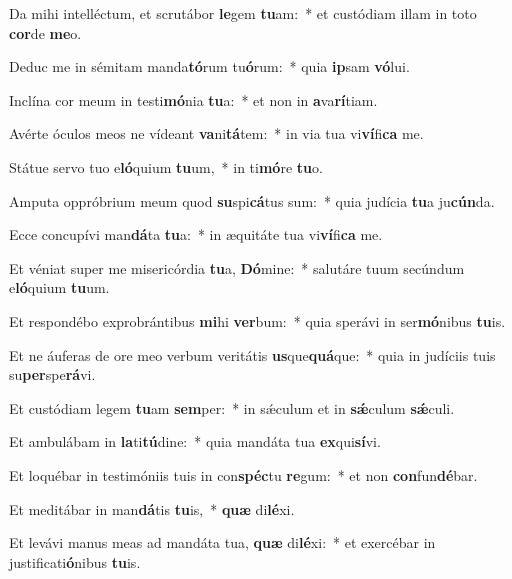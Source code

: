 \item Da mihi intelléctum, et scrutábor \textbf{le}gem \textbf{tu}am:~* et custódiam illam in toto \textbf{cor}de \textbf{me}o.
\item Deduc me in sémitam manda\textbf{tó}rum tu\textbf{ó}rum:~* quia \textbf{ip}sam \textbf{vó}lui.
\item Inclína cor meum in testi\textbf{mó}nia \textbf{tu}a:~* et non in \textbf{a}va\textbf{rí}tiam.
\item Avérte óculos meos ne vídeant \textbf{va}ni\textbf{tá}tem:~* in via tua vi\textbf{ví}fi\textbf{ca} me.
\item Státue servo tuo e\textbf{ló}quium \textbf{tu}um,~* in ti\textbf{mó}re \textbf{tu}o.
\item Amputa oppróbrium meum quod \textbf{su}spi\textbf{cá}tus sum:~* quia judícia \textbf{tu}a ju\textbf{cún}da.
\item Ecce concupívi man\textbf{dá}ta \textbf{tu}a:~* in æquitáte tua vi\textbf{ví}fi\textbf{ca} me.
\item Et véniat super me misericórdia \textbf{tu}a, \textbf{Dó}mine:~* salutáre tuum secúndum e\textbf{ló}quium \textbf{tu}um.
\item Et respondébo exprobrántibus \textbf{mi}hi \textbf{ver}bum:~* quia sperávi in ser\textbf{mó}nibus \textbf{tu}is.
\item Et ne áuferas de ore meo verbum veritátis \textbf{us}que\textbf{quá}que:~* quia in judíciis tuis su\textbf{per}spe\textbf{rá}vi.
\item Et custódiam legem \textbf{tu}am \textbf{sem}per:~* in sǽculum et in \textbf{sǽ}culum \textbf{sǽ}culi.
\item Et ambulábam in \textbf{la}ti\textbf{tú}dine:~* quia mandáta tua \textbf{ex}qui\textbf{sí}vi.
\item Et loquébar in testimóniis tuis in con\textbf{spéc}tu \textbf{re}gum:~* et non \textbf{con}fun\textbf{dé}bar.
\item Et meditábar in man\textbf{dá}tis \textbf{tu}is,~* \textbf{quæ} di\textbf{lé}xi.
\item Et levávi manus meas ad mandáta tua, \textbf{quæ} di\textbf{lé}xi:~* et exercébar in justificati\textbf{ó}nibus \textbf{tu}is.
